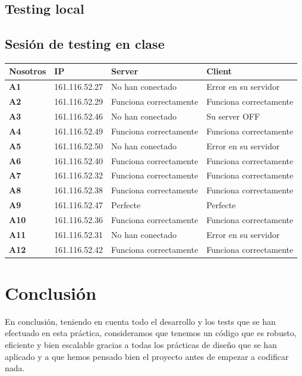 \subsection*{Testing local}

\newpage
\subsection*{Sesión de testing en clase}
\begin{center}
    \begin{tabular}{| l || l | l | l |}
    \hline
    \textbf{Nosotros} & \textbf{IP} & \textbf{Server} & \textbf{Client} \\ \hline
    \textbf{A1} & 161.116.52.27 & No han conectado  & Error en su servidor \\ \hline
       \textbf{A2} & 161.116.52.29 &  Funciona correctamente & Funciona correctamente\\ \hline
       \textbf{A3}     & 161.116.52.46 & No han conectado   & Su server OFF\\
       \textbf{A4}     & 161.116.52.49 & Funciona correctamente  & Funciona correctamente\\ \hline
       \textbf{A5}     & 161.116.52.50 & No han conectado   & Error en su servidor\\ \hline
       \textbf{A6}     & 161.116.52.40 & Funciona correctamente  & Funciona correctamente\\ \hline
       \textbf{A7}     & 161.116.52.32 & Funciona correctamente  & Funciona correctamente\\ \hline
       \textbf{A8}     & 161.116.52.38 & Funciona correctamente  & Funciona correctamente\\ \hline
       \textbf{A9}     & 161.116.52.47 & Perfecte  & Perfecte\\ \hline
       \textbf{A10}     & 161.116.52.36 &  Funciona correctamente & Funciona correctamente\\ \hline
       \textbf{A11}     & 161.116.52.31 & No han conectado   & Error en su servidor\\ \hline
       \textbf{A12}     & 161.116.52.42 & Funciona correctamente  & Funciona correctamente\\ \hline
    \end{tabular}
\end{center}

\newpage
\section*{Conclusión}
En conclusión, teniendo en cuenta todo el desarrollo y los tests que se han efectuado en esta práctica, consideramos que tenemos un código que es robusto, eficiente y bien escalable gracias a todas los prácticas de diseño que se han aplicado y a que hemos pensado bien el proyecto antes de empezar a codificar nada.

